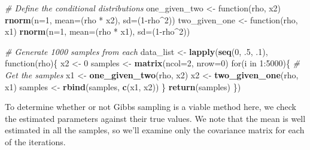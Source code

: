 \documentclass[]{article}
\newenvironment{Shaded}{\begin{snugshade}}{\end{snugshade}}
\newcommand{\KeywordTok}[1]{\textcolor[rgb]{0.13,0.29,0.53}{\textbf{{#1}}}}
\newcommand{\DataTypeTok}[1]{\textcolor[rgb]{0.13,0.29,0.53}{{#1}}}
\newcommand{\DecValTok}[1]{\textcolor[rgb]{0.00,0.00,0.81}{{#1}}}
\newcommand{\StringTok}[1]{\textcolor[rgb]{0.31,0.60,0.02}{{#1}}}
\newcommand{\CommentTok}[1]{\textcolor[rgb]{0.56,0.35,0.01}{\textit{{#1}}}}
\newcommand{\NormalTok}[1]{{#1}}
\begin{document}
\begin{Shaded}
\begin{Highlighting}[]
\CommentTok{# Define the conditional distributions}
\NormalTok{one_given_two <-}\StringTok{ }\NormalTok{function(rho, x2) }\KeywordTok{rnorm}\NormalTok{(}\DataTypeTok{n=}\DecValTok{1}\NormalTok{, }\DataTypeTok{mean=}\NormalTok{(rho *}\StringTok{ }\NormalTok{x2), }\DataTypeTok{sd=}\NormalTok{(}\DecValTok{1}\NormalTok{-rho^}\DecValTok{2}\NormalTok{))}
\NormalTok{two_given_one <-}\StringTok{ }\NormalTok{function(rho, x1) }\KeywordTok{rnorm}\NormalTok{(}\DataTypeTok{n=}\DecValTok{1}\NormalTok{, }\DataTypeTok{mean=}\NormalTok{(rho *}\StringTok{ }\NormalTok{x1), }\DataTypeTok{sd=}\NormalTok{(}\DecValTok{1}\NormalTok{-rho^}\DecValTok{2}\NormalTok{))}

\CommentTok{# Generate 1000 samples from each}
\NormalTok{data_list <-}\StringTok{ }\KeywordTok{lapply}\NormalTok{(}\KeywordTok{seq}\NormalTok{(}\DecValTok{0}\NormalTok{, .}\DecValTok{5}\NormalTok{, .}\DecValTok{1}\NormalTok{), function(rho)\{}
  \NormalTok{x2 <-}\StringTok{ }\DecValTok{0}
  \NormalTok{samples <-}\StringTok{ }\KeywordTok{matrix}\NormalTok{(}\DataTypeTok{ncol=}\DecValTok{2}\NormalTok{, }\DataTypeTok{nrow=}\DecValTok{0}\NormalTok{)}
  \NormalTok{for(i in }\DecValTok{1}\NormalTok{:}\DecValTok{5000}\NormalTok{)\{}
    \CommentTok{# Get the samples}
    \NormalTok{x1 <-}\StringTok{ }\KeywordTok{one_given_two}\NormalTok{(rho, x2)}
    \NormalTok{x2 <-}\StringTok{ }\KeywordTok{two_given_one}\NormalTok{(rho, x1)}
    \NormalTok{samples <-}\StringTok{ }\KeywordTok{rbind}\NormalTok{(samples, }\KeywordTok{c}\NormalTok{(x1, x2))}
  \NormalTok{\}}
  \KeywordTok{return}\NormalTok{(samples)}
\NormalTok{\})}
\end{Highlighting}
\end{Shaded}

To determine whether or not Gibbs sampling is a viable method here, we
check the estimated parameters against their true values. We note that
the mean is well estimated in all the samples, so we'll examine only the
covariance matrix for each of the iterations.
\end{document}
